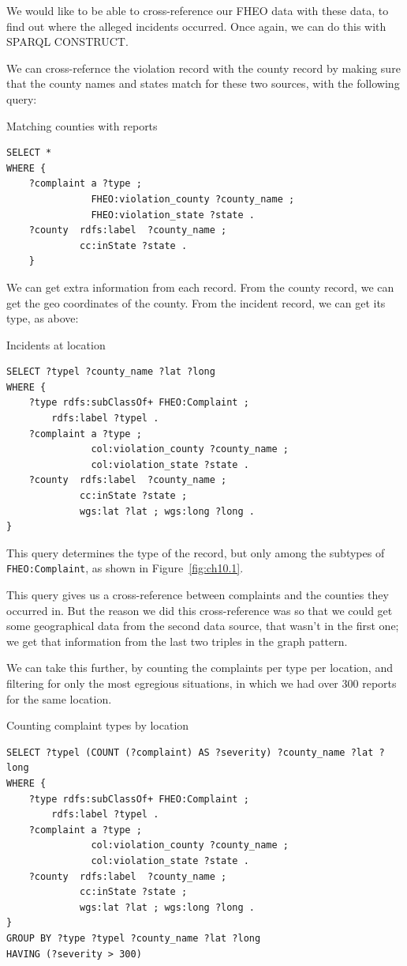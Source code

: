 We would like to be able to cross-reference our FHEO data with these
data, to find out where the alleged incidents occurred. Once again, we
can do this with SPARQL CONSTRUCT.

We can cross-refernce the violation record with the county record by 
making sure that the county names and states match for these two sources, with the following
query:

\begin{query}Matching counties with reports\end{query}
\begin{lstlisting}
SELECT *
WHERE {
    ?complaint a ?type ;
               FHEO:violation_county ?county_name ;
               FHEO:violation_state ?state .
    ?county  rdfs:label  ?county_name ;
             cc:inState ?state .
    }
\end{lstlisting}

We can get extra information from each record.  From the county record, 
we can get the geo coordinates of the county.  From the incident record, we can get 
its type, as above:

\begin{query}Incidents at location\end{query}
\begin{lstlisting}
SELECT ?typel ?county_name ?lat ?long 
WHERE {    
    ?type rdfs:subClassOf+ FHEO:Complaint ;
        rdfs:label ?typel .
    ?complaint a ?type ;
               col:violation_county ?county_name ;
               col:violation_state ?state .
    ?county  rdfs:label  ?county_name ;
             cc:inState ?state ;
             wgs:lat ?lat ; wgs:long ?long .
}
\end{lstlisting}

This query determines the type of the record, but only among the subtypes
of \texttt{FHEO:Complaint}, as shown in Figure~\ref{fig:ch10.1}.

This query gives us a cross-reference between complaints and the
counties they occurred in. But the reason we did this cross-reference
was so that we could get some geographical data from the second
data source, that wasn't in the first one; we get that information from
the last two triples in the graph pattern.

We can take this further, by counting the complaints per type per location, 
and filtering for only the most egregious situations, in which we had 
over 300 reports for the same location.  

\begin{query}Counting complaint types by location\end{query}
\begin{lstlisting}
SELECT ?typel (COUNT (?complaint) AS ?severity) ?county_name ?lat ?long
WHERE {    
    ?type rdfs:subClassOf+ FHEO:Complaint ;
        rdfs:label ?typel .
    ?complaint a ?type ;
               col:violation_county ?county_name ;
               col:violation_state ?state .
    ?county  rdfs:label  ?county_name ;
             cc:inState ?state ;
             wgs:lat ?lat ; wgs:long ?long .
}
GROUP BY ?type ?typel ?county_name ?lat ?long
HAVING (?severity > 300)
\end{lstlisting}


